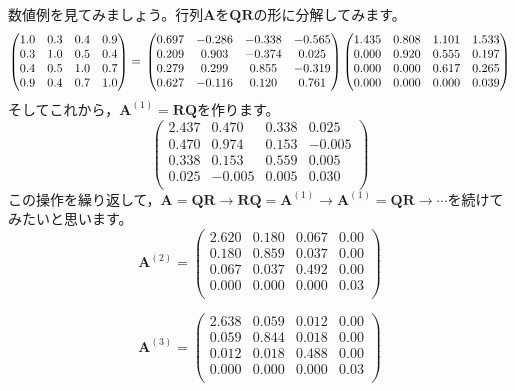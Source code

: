 \documentclass{ltjsbook}
\begin{document}
数値例を見てみましょう。行列$\bm{A}$を$\bm{QR}$の形に分解してみます。
\[
	\begin{pmatrix}
		1.0 & 0.3 & 0.4 & 0.9 \\
		0.3 & 1.0 & 0.5 & 0.4 \\
		0.4 & 0.5 & 1.0 & 0.7 \\
		0.9 & 0.4 & 0.7 & 1.0\end{pmatrix}
	=\\
	\begin{pmatrix}
		0.697 & -0.286 & -0.338 & -0.565 \\
		0.209 & 0.903  & -0.374 & 0.025  \\
		0.279 & 0.299  & 0.855  & -0.319 \\
		0.627 & -0.116 & 0.120  & 0.761  \\
	\end{pmatrix}
	\begin{pmatrix}
		1.435 & 0.808 & 1.101 & 1.533 \\
		0.000 & 0.920 & 0.555 & 0.197 \\
		0.000 & 0.000 & 0.617 & 0.265 \\
		0.000 & 0.000 & 0.000 & 0.039 \\
	\end{pmatrix}
\]
そしてこれから，$\bm{A}^{(1)} = \bm{RQ}$を作ります。
\[
	\begin{pmatrix}
		2.437 & 0.470  & 0.338 & 0.025  \\
		0.470 & 0.974  & 0.153 & -0.005 \\
		0.338 & 0.153  & 0.559 & 0.005  \\
		0.025 & -0.005 & 0.005 & 0.030  \\
	\end{pmatrix}
\]
この操作を繰り返して，$\bm{A}=\bm{QR} \to \bm{RQ} = \bm{A}^{(1)} \to \bm{A}^{(1)} = \bm{QR} \to \cdots$を続けてみたいと思います。
\[
	\bm{A}^{(2)} =
	\begin{pmatrix}
		2.620 & 0.180 & 0.067 & 0.00 \\
		0.180 & 0.859 & 0.037 & 0.00 \\
		0.067 & 0.037 & 0.492 & 0.00 \\
		0.000 & 0.000 & 0.000 & 0.03 \\
	\end{pmatrix}
\]

\[
	\bm{A}^{(3)} =
	\begin{pmatrix}
		2.638 & 0.059 & 0.012 & 0.00 \\
		0.059 & 0.844 & 0.018 & 0.00 \\
		0.012 & 0.018 & 0.488 & 0.00 \\
		0.000 & 0.000 & 0.000 & 0.03 \\
	\end{pmatrix}
\]
\end{document}
